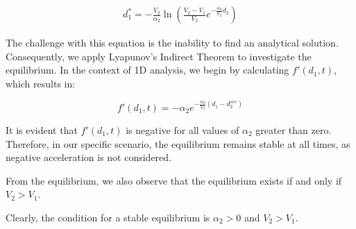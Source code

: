 \documentclass{article}
\begin{document}
	\begin{align*}
		\boxed{d_1^* = -\frac{V_2}{\alpha_2}\ln \left(\frac{V_2-V_1}{V_2}e^{-\frac{\alpha_2}{V_2}d_2} \right)}
	\end{align*}
	
	The challenge with this equation is the inability to find an analytical solution. Consequently, we apply Lyapunov's Indirect Theorem to investigate the equilibrium. In the context of 1D analysis, we begin by calculating $f'(d_1, t)$, which results in:
	
	\[
		\boxed{f'(d_1, t) = -\alpha_2e^{-\frac{\alpha_2}{V_2}(d_1 - d_{2}^{sec})}}
		\]
	
	It is evident that $f'(d_1, t)$ is negative for all values of $\alpha_2$ greater than zero. Therefore, in our specific scenario, the equilibrium remains stable at all times, as negative acceleration is not considered.
	
	From the equilibrium, we also observe that the equilibrium exists if and only if $V_2 > V_1$.
	
	Clearly, the condition for a stable equilibrium is $\alpha_2 > 0$ and $V_2 > V_1$.
	
\end{document}
